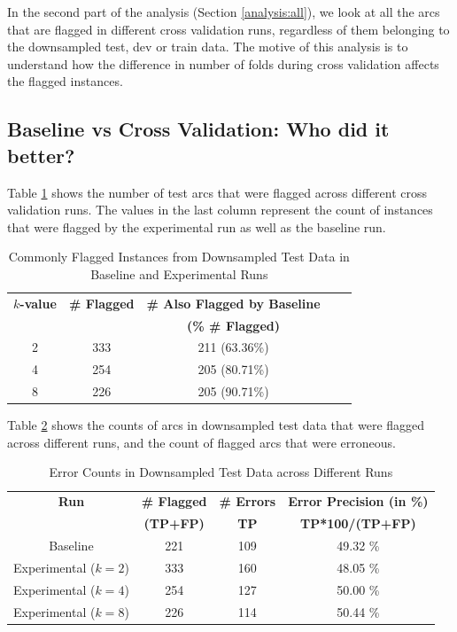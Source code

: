 In the second part of the analysis (Section \ref{analysis:all}), we look at all the arcs that are flagged in different cross validation runs, regardless of them belonging to the downsampled test, dev or train data. The motive of this analysis is to understand how the difference in number of folds during cross validation affects the flagged instances.

\subsection{Baseline vs Cross Validation: Who did it better?}
\label{analysis:test}

Table \ref{tab:test_lisca} shows the number of test arcs that were flagged across different cross validation runs. The values in the last column represent the count of instances that were flagged by the experimental run as well as the baseline run. 

\begin{table}[H]
    \centering
    \begin{tabular}{|c||c|c|c|c|}
    \hline
    \multicolumn{1}{|c||}{\textbf{\(k\)-value}} &
    \multicolumn{1}{c|}{\textbf{\# Flagged}} &
    \multicolumn{1}{c|}{\textbf{\# Also Flagged by Baseline}}\\
     & & \textbf{(\% \# Flagged)}\\
    \hline
    2 & 333 & 211 (63.36\%) \\
    4 & 254 & 205 (80.71\%) \\
    8 & 226 & 205 (90.71\%) \\
    \hline
    \end{tabular}
    \caption{Commonly Flagged Instances from Downsampled Test Data in Baseline and Experimental Runs}
    \label{tab:test_lisca}
\end{table}

Table \ref{tab:baseline_cv_error_percentage} shows the counts of arcs in downsampled test data that were flagged across different runs, and the count of flagged arcs that were erroneous.

\begin{table}[H]
    \centering
    \begin{tabular}{|c|c|c|c|}
    \hline
    \textbf{Run} & \textbf{\# Flagged} & \textbf{\# Errors} & \textbf{Error Precision (in \%)}\\
    \textbf{ } & \textbf{(TP+FP)} & \textbf{TP} & \textbf{TP*100/(TP+FP)}\\
    \hline
    Baseline & 221 & 109 & 49.32 \%\\
    Experimental (\(k=2\)) & 333 & 160 & 48.05 \%\\
    Experimental (\(k=4\)) & 254 & 127 & 50.00 \%\\
    Experimental (\(k=8\)) & 226 & 114 & 50.44 \%\\
    \hline
    \end{tabular}
    \caption{Error Counts in Downsampled Test Data across Different Runs}
    \label{tab:baseline_cv_error_percentage}
\end{table}

